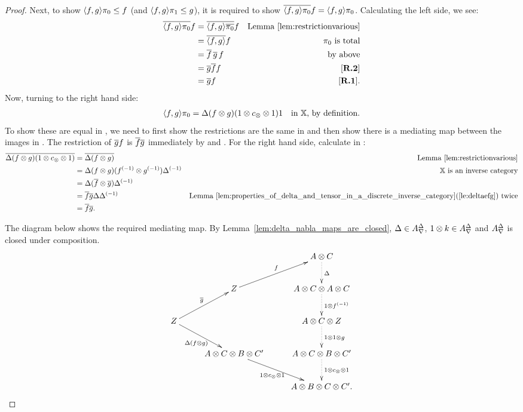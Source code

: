 \begin{proof}
  Next, to show $\langle f,g\rangle \pi_0 \le f$ (and $\langle f,g\rangle \pi_1 \le g$), it is required to show
  $\overline{\langle f,g\rangle\pi_{0}} f = \langle f,g\rangle \pi_{0}$. Calculating the left side, we see:
  \begin{align*}
    \overline{\langle f,g\rangle\pi_{0}} f &=\overline{\langle f,g\rangle\overline{\pi_{0}}} f &\text{Lemma \ref{lem:restrictionvarious}}\\
    &=\overline{\langle f,g\rangle} f &\pi_{0}\text{ is total}\\
    &=\overline{f}\,\overline{g}\, f&\text{ by above}\\
    &=\overline{g} \overline{f} f & [\text{\bfseries {R}.{2}}]\\
    &=\overline{g} f& [\text{\bfseries {R}.{1}}].
  \end{align*}
  Now, turning to the right hand side:
  \begin{align*}
    \langle f,g\rangle\pi_{0} &= \Delta(f\otimes g)(1\otimes c_{\otimes}\otimes1) 1 &\text{in \ensuremath{\mathbb{X}}, by definition.}
  \end{align*}
  To show these are equal in \Xt, we need to first show the restrictions are the same in \X and
  then show there is a mediating map between the images in \X. The restriction of $\overline{g} f$ is
  $\overline{f} \overline{g}$ immediately by \rthree and \rtwo. For the right hand side, calculate in \X:
  \begin{align*}
    \overline{\Delta(f\otimes g)(1\otimes c_{\otimes}\otimes1)}
      & = \overline{\Delta(f\otimes g)} & \text{Lemma  \ref{lem:restrictionvarious}}\\
    & = \Delta(f\otimes g)({f}^{(-1)} \otimes {g}^{(-1)}){\Delta}^{(-1)} & \mathbb{X} \text{ is an inverse category}\\
    & = \Delta(\overline{f} \otimes \overline{g}){\Delta}^{(-1)} & \\
    & = \overline{f} \overline{g} \Delta{\Delta}^{(-1)}
      & \text{Lemma \ref{lem:properties_of_delta_and_tensor_in_a_discrete_inverse_category}(\ref{le:deltaefg}) twice}\\
    & = \overline{f} \overline{g}.
  \end{align*}

  The diagram below shows the required mediating map. By
  Lemma~\ref{lem:delta_nabla_maps_are_closed}, $\Delta\in{A}^{\Delta}_{\nabla}$, $1\otimes k\in{A}^{\Delta}_{\nabla}$ and ${A}^{\Delta}_{\nabla}$
  is closed under composition.
  \[
    \xymatrix @C=27pt @R=25pt{
      & &  A \* C\ar@{.>}[d]^{\Delta}\\
      &Z\ar[ur]^{f}&  A\* C \* A \* C\ar@{.>}[d]^{1\*\inv{f}}\\
      Z\ar[ur]^{\rst{g}}\ar[dr]_{\Delta(f\*g)}& &  A \*C \* Z \ar@{.>}[d]^{1 \* 1 \* g}\\
      &A\*C\*B\* C'\ar[dr]_{1\*c_{\*}\*1}&  A\*C\*B\*C'\ar@{.>}[d]^{1\*c_{\*}\*1}\\
      & & A\*B\*C\*C'.
    }
  \]
\end{proof}

